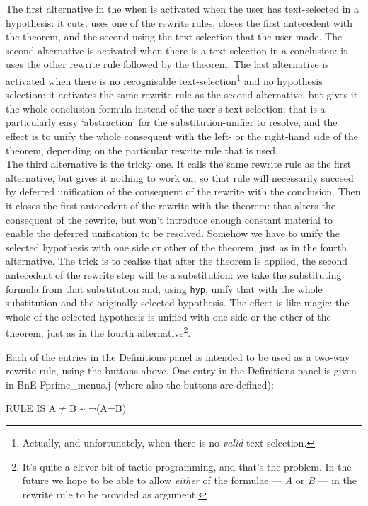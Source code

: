 The first alternative in the when is activated when the user has text-selected in a hypothesis: it cuts, uses one of the rewrite rules, closes the first antecedent with the theorem, and the second using the text-selection that the user made. The second alternative is activated when there is a text-selection in a conclusion: it uses the other rewrite rule followed by the theorem. The last alternative is activated when there is no recognisable text-selection\footnote{Actually, and unfortunately, when there is no \textit{valid} text selection.} and no hypothesis selection: it activates the same rewrite rule as the second alternative, but gives it the whole conclusion formula instead of the user's text selection: that is a particularly easy `abstraction' for the substitution-unifier to resolve, and the effect is to unify the whole consequent with the left- or the right-hand side of the theorem, depending on the particular rewrite rule that is used.\\
The third alternative is the tricky one. It calls the same rewrite rule as the first alternative, but gives it nothing to work on, so that rule will necessarily succeed by deferred unification of the consequent of the rewrite with the conclusion. Then it closes the first antecedent of the rewrite with the theorem: that alters the consequent of the rewrite, but won't introduce enough constant material to enable the deferred unification to be resolved. Somehow we have to unify the selected hypothesis with one side or other of the theorem, just as in the fourth alternative. The trick is to realise that after the theorem is applied, the second antecedent of the rewrite step will be a substitution: we take the substituting formula from that substitution and, using \texttt{hyp}, unify that with the whole substitution and the originally-selected hypothesis. The effect is like magic: the whole of the selected hypothesis is unified with one side or the other of the theorem, just as in the fourth alternative\footnote{It's quite a clever bit of tactic programming, and that's the problem. In the future we hope to be able to allow \textit{either} of the formulae --- \textit{A} or \textit{B} --- in the rewrite rule to be provided as argument.}.


Each of the entries in the Definitions panel is intended to be used as a two-way rewrite rule, using the buttons above. One entry in the Definitions panel is given in BnE-Fprime\_menus.j (where also the buttons are defined):

RULE IS A\ensuremath{\neq}B \~{} ¬(A=B)


